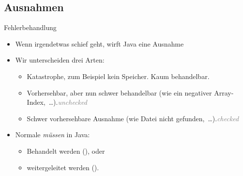 \subsection{Ausnahmen}
{\def\t#1{\hfill\textcolor{gray}{\itshape#1}}
\begin{frame}{Fehlerbehandlung}
   \begin{itemize}[<+(1)->]
      \itemsep8pt
      \item Wenn irgendetwas schief geht, wirft Java eine Ausnahme
      \item Wir unterscheiden drei Arten: \begin{itemize}
         \item {} Katastrophe, zum Beispiel kein Speicher. Kaum behandelbar.
         \item {} Vorhersehbar, aber nun schwer behandelbar (wie ein negativer Array-Index,~\ldots).\t{unchecked}
         \item {} Schwer vorhersehbare Ausnahme (wie Datei nicht gefunden,~\ldots).\t{checked}
      \end{itemize}
      \item Normale  \emph{müssen} in Java: \begin{itemize}
         \item Behandelt werden (), oder
         \item weitergeleitet werden ().
      \end{itemize}
   \end{itemize}
\end{frame}

}
